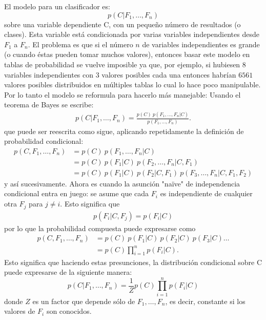 	El modelo para un clasificador es:
		$$p(C \vert F_1,\dots,F_n)$$
	sobre una variable dependiente C, con un pequeño número de resultados (o clases). Esta variable está condicionada por varias variables independientes desde $F_1$ a $F_n$. El problema es que si el número $n$ de variables independientes es grande (o cuando éstas pueden tomar muchos valores), entonces basar este modelo en tablas de probabilidad se vuelve imposible ya que, por ejemplo, si hubiesen $8$ variables independientes con $3$ valores posibles cada una entonces habrían $6561$ valores posibles distribuidos en múltiples tablas lo cual lo hace poco manipulable. Por lo tanto el modelo se reformula para hacerlo más manejable:
Usando el teorema de Bayes se escribe:
		\begin{align*}
		p(C \vert F_1,\dots,F_n) = \frac{p(C) \ p(F_1,\dots,F_n\vert C)}{p(F_1,\dots,F_n)}.
		\end{align*}
		que puede ser reescrita como sigue, aplicando repetidamente la definición de probabilidad condicional:
		\begin{align}
		p(C, F_1, \dots, F_n)
		&= p(C) \ p(F_1,\dots,F_n\vert C) \\
		&= p(C) \ p(F_1\vert C) \ p(F_2,\dots,F_n\vert C, F_1) \\
		&= p(C) \ p(F_1\vert C) \ p(F_2\vert C, F_1) \ p(F_3,\dots,F_n\vert C, F_1, F_2)
		\end{align}
		y así sucesivamente. Ahora es cuando la asunción "na\"{i}ve" de independencia condicional entra en juego: se asume que cada $F_i$ es independiente de cualquier otra $F_j$ para $j \neq i$. Esto significa que
		\begin{align*}
		p(F_i \vert C, F_j) = p(F_i \vert C)
		\end{align*}
		por lo que la probabilidad compuesta puede expresarse como
		\begin{align*}
		p(C, F_1, \dots, F_n) 
		&= p(C) \ p(F_1\vert C) \ p(F_2\vert C) \ p(F_3\vert C) \dots \\
		&= p(C) \prod_{i=1}^n p(F_i \vert C).
		\end{align*}
		Esto significa que haciendo estas presunciones, la distribución condicional sobre C puede expresarse de la siguiente manera:
		$$p(C \vert F_1,\dots,F_n) = \frac{1}{Z}p(C)\prod_{i=1}^n p(F_i \vert C)$$
		donde $Z$ es un factor que depende sólo de $F_1,\dots , F_n$, es decir, constante si los valores de $F_i$ son conocidos.
		